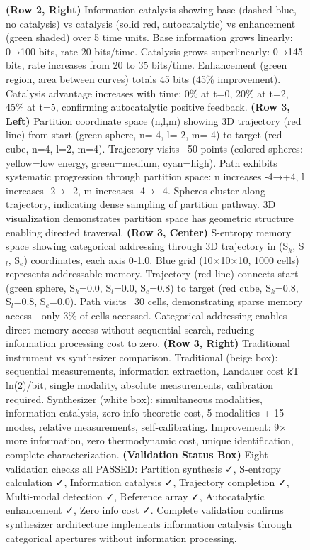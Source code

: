 \begin{figure}[htbp]
{    \textbf{(Row 2, Right)} Information catalysis showing base (dashed blue, no catalysis) vs catalysis (solid red, autocatalytic) vs enhancement (green shaded) over 5 time units. Base information grows linearly: 0→100 bits, rate 20 bits/time. Catalysis grows superlinearly: 0→145 bits, rate increases from 20 to 35 bits/time. Enhancement (green region, area between curves) totals 45 bits (45\% improvement). Catalysis advantage increases with time: 0\% at t=0, 20\% at t=2, 45\% at t=5, confirming autocatalytic positive feedback. 
    \textbf{(Row 3, Left)} Partition coordinate space (n,l,m) showing 3D trajectory (red line) from start (green sphere, n=-4, l=-2, m=-4) to target (red cube, n=4, l=2, m=4). Trajectory visits ~50 points (colored spheres: yellow=low energy, green=medium, cyan=high). Path exhibits systematic progression through partition space: n increases -4→+4, l increases -2→+2, m increases -4→+4. Spheres cluster along trajectory, indicating dense sampling of partition pathway. 3D visualization demonstrates partition space has geometric structure enabling directed traversal. 
    \textbf{(Row 3, Center)} S-entropy memory space showing categorical addressing through 3D trajectory in (S$_k$, S$_l$, S$_e$) coordinates, each axis 0-1.0. Blue grid (10×10×10, 1000 cells) represents addressable memory. Trajectory (red line) connects start (green sphere, S$_k$=0.0, S$_l$=0.0, S$_e$=0.8) to target (red cube, S$_k$=0.8, S$_l$=0.8, S$_e$=0.0). Path visits ~30 cells, demonstrating sparse memory access—only 3\% of cells accessed. Categorical addressing enables direct memory access without sequential search, reducing information processing cost to zero. 
    \textbf{(Row 3, Right)} Traditional instrument vs synthesizer comparison. Traditional (beige box): sequential measurements, information extraction, Landauer cost kT ln(2)/bit, single modality, absolute measurements, calibration required. Synthesizer (white box): simultaneous modalities, information catalysis, zero info-theoretic cost, 5 modalities + 15 modes, relative measurements, self-calibrating. Improvement: 9× more information, zero thermodynamic cost, unique identification, complete characterization. 
    \textbf{(Validation Status Box)} Eight validation checks all PASSED: Partition synthesis ✓, S-entropy calculation ✓, Information catalysis ✓, Trajectory completion ✓, Multi-modal detection ✓, Reference array ✓, Autocatalytic enhancement ✓, Zero info cost ✓. Complete validation confirms synthesizer architecture implements information catalysis through categorical apertures without information processing.}
    \label{fig:synthesizer_architecture}
\end{figure}

